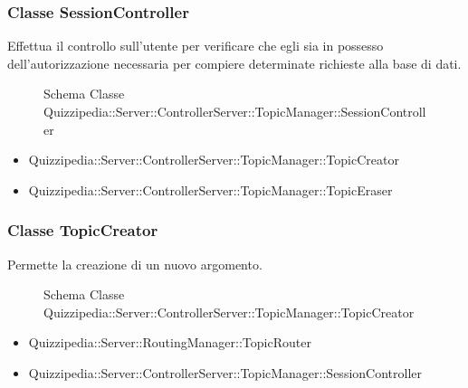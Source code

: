 \subsubsection{Classe SessionController}
Effettua il controllo sull'utente per verificare che egli sia in possesso dell'autorizzazione necessaria per compiere determinate richieste alla base di dati.
\begin{figure}[H]
\centering
\noindent{}
\caption[Schema Classe SessionController]{Schema Classe Quizzipedia::Server::ControllerServer::TopicManager::SessionController}
\end{figure}
\begin{itemize}
\item Quizzipedia::Server::ControllerServer::TopicManager::TopicCreator
\item Quizzipedia::Server::ControllerServer::TopicManager::TopicEraser
\end{itemize}
\subsubsection{Classe TopicCreator}
Permette la creazione di un nuovo argomento.
\begin{figure}[H]
\centering
\noindent{}
\caption[Schema Classe TopicCreator]{Schema Classe Quizzipedia::Server::ControllerServer::TopicManager::TopicCreator}
\end{figure}
\begin{itemize}
\item Quizzipedia::Server::RoutingManager::TopicRouter
\end{itemize}
\begin{itemize}
\item Quizzipedia::Server::ControllerServer::TopicManager::SessionController
\end{itemize}
